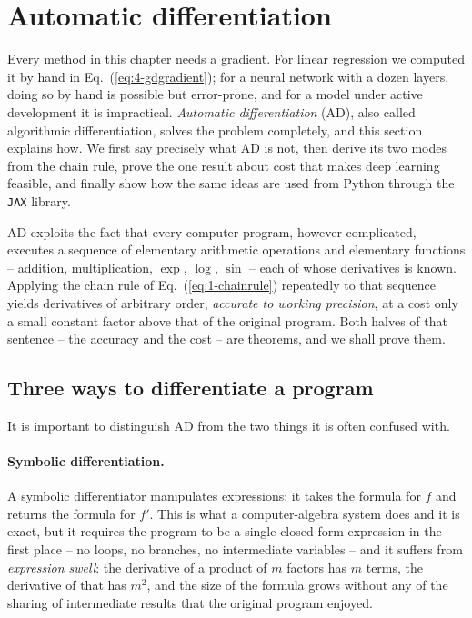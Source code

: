 
\section{Automatic differentiation}
\label{sec:autodiff}

Every method in this chapter needs a gradient.  For linear regression we
computed it by hand in Eq.~(\ref{eq:4-gdgradient}); for a neural network with
a dozen layers, doing so by hand is possible but error-prone, and for a model
under active development it is impractical.  \emph{Automatic differentiation}
(AD), also called algorithmic differentiation, solves the problem completely,
and this section explains how.  We first say precisely what AD is not, then
derive its two modes from the chain rule, prove the one result about cost that
makes deep learning feasible, and finally show how the same ideas are used
from Python through the \texttt{JAX} library.

AD exploits the fact that every computer program, however complicated,
executes a sequence of elementary arithmetic operations and elementary
functions -- addition, multiplication, $\exp$, $\log$, $\sin$ -- each of whose
derivatives is known.  Applying the chain rule of Eq.~(\ref{eq:1-chainrule})
repeatedly to that sequence yields derivatives of arbitrary order,
\emph{accurate to working precision}, at a cost only a small constant factor
above that of the original program.  Both halves of that sentence -- the
accuracy and the cost -- are theorems, and we shall prove them.

\subsection{Three ways to differentiate a program}
\label{sec:adthreeways}

It is important to distinguish AD from the two things it is often confused
with.

\paragraph{Symbolic differentiation.}
A symbolic differentiator manipulates expressions: it takes the formula for $f$ and returns the formula
for $f'$.  This is what a computer-algebra system does and it is exact, but it
requires the program to be a single closed-form expression in the first place
-- no loops, no branches, no intermediate variables -- and it suffers from
\emph{expression swell}: the derivative of a product of $m$ factors has $m$
terms, the derivative of that has $m^{2}$, and the size of the formula grows
without any of the sharing of intermediate results that the original program
enjoyed.

